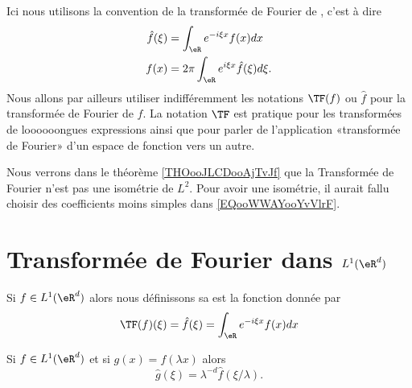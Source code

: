 

Ici nous utilisons la convention de la transformée de Fourier de , c'est à dire
\begin{subequations}
    \begin{align}
        \hat f(\xi)&=\int_{\eR} e^{-i\xi x}f(x)dx  \label{EQooWWAYooYvVlrF}\\
        f(x)&=2\pi\int_{\eR} e^{i\xi x}\hat f(\xi)d\xi.
    \end{align}
\end{subequations}
Nous allons par ailleurs utiliser indifféremment les notations \( \TF(f)\) ou \( \hat f\) pour la transformée de Fourier de \( f\). La notation \( \TF\) est pratique pour les transformées de loooooongues expressions ainsi que pour parler de l'application «transformée de Fourier» d'un espace de fonction vers un autre.

\begin{normaltext}
    Nous verrons dans le théorème \ref{THOooJLCDooAjTvJf} que la Transformée de Fourier n'est pas une isométrie de \( L^2\). Pour avoir une isométrie, il aurait fallu choisir des coefficients moins simples dans \eqref{EQooWWAYooYvVlrF}.
\end{normaltext}

\section{Transformée de Fourier dans \( L^1(\eR^d)\)}

\begin{definition}      \label{DEFooJAIUooFbaRkR}
    Si \( f\in L^1(\eR^d)\) alors nous définissons sa  est la fonction donnée par
    \begin{equation}
        \TF(f)(\xi)=\hat f(\xi)=\int_{\eR} e^{-i\xi x}f(x)dx
    \end{equation}
\end{definition}

\begin{lemma}       \label{LEMooKGDKooVXSMCn}
    Si \( f\in L^1(\eR^d)\) et si \( g(x)=f(\lambda x)\) alors
    \begin{equation}
        \hat g(\xi)=\lambda^{-d}\hat f(\xi/\lambda).
    \end{equation}
\end{lemma}

